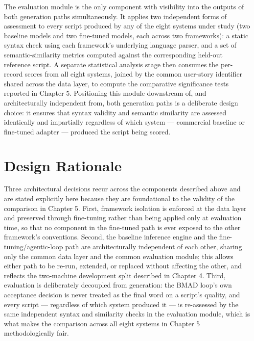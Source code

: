 The evaluation module is the only component with visibility into the
outputs of both generation paths simultaneously. It applies two
independent forms of assessment to every script produced by any of the
eight systems under study (two baseline models and two fine-tuned
models, each across two frameworks): a static syntax check using each
framework's underlying language parser, and a set of semantic-similarity
metrics computed against the corresponding held-out reference script. A
separate statistical analysis stage then consumes the per-record scores
from all eight systems, joined by the common user-story identifier
shared across the data layer, to compute the comparative significance
tests reported in Chapter 5. Positioning this module downstream of, and
architecturally independent from, both generation paths is a deliberate
design choice: it ensures that syntax validity and semantic similarity
are assessed identically and impartially regardless of which system ---
commercial baseline or fine-tuned adapter --- produced the script being
scored.

\section{Design Rationale}

Three architectural decisions recur across the components described
above and are stated explicitly here because they are foundational to
the validity of the comparison in Chapter 5. First, framework isolation
is enforced at the data layer and preserved through fine-tuning rather
than being applied only at evaluation time, so that no component in the
fine-tuned path is ever exposed to the other framework's conventions.
Second, the baseline inference engine and the fine-tuning/agentic-loop
path are architecturally independent of each other, sharing only the
common data layer and the common evaluation module; this allows either
path to be re-run, extended, or replaced without affecting the other,
and reflects the two-machine development split described in Chapter 4.
Third, evaluation is deliberately decoupled from generation: the BMAD
loop's own acceptance decision is never treated as the final word on a
script's quality, and every script --- regardless of which system
produced it --- is re-assessed by the same independent syntax and
similarity checks in the evaluation module, which is what makes the
comparison across all eight systems in Chapter 5 methodologically fair.
